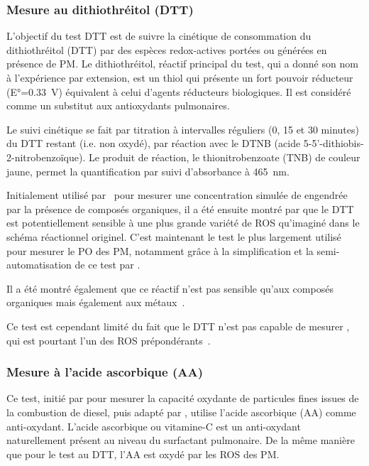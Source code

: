 \subsubsection{Mesure au dithiothréitol (DTT)}%
\label{ssub:mesure_au_dtt}

L’objectif du test DTT est de suivre la cinétique de consommation du dithiothréitol (DTT)
par des espèces redox-actives portées ou générées en présence de PM. Le dithiothréitol,
réactif principal du test, qui a donné son nom à l’expérience par extension, est un thiol
qui présente un fort pouvoir réducteur (E°=\SI{0.33}{\V}) équivalent à celui d’agents réducteurs
biologiques. Il est considéré comme un substitut aux antioxydants pulmonaires.

Le suivi cinétique se fait par titration à intervalles réguliers (0, 15 et 30 minutes) du DTT
restant (i.e. non oxydé), par réaction avec le DTNB (acide
5-5'-dithiobis-2-nitrobenzoïque). Le produit de réaction, le thionitrobenzoate (TNB) de
couleur jaune, permet la quantification par suivi d'absorbance à \SI{465}{nm}.

Initialement utilisé par~\textcite{choRedox2005} pour mesurer une concentration simulée de
 engendrée par la présence de composés organiques, il a été ensuite montré par
\textcite{beiReaction2014} que le DTT est potentiellement sensible à une plus grande
variété de ROS qu'imaginé dans le schéma réactionnel originel. C'est maintenant le test le
plus largement utilisé pour mesurer le PO des PM, notamment grâce à la simplification et
la semi-automatisation de ce test par \textcite{fangSemiautomated2015}.

Il a été montré également que ce réactif n'est pas sensible qu'aux composés organiques
mais également aux métaux~\autocite{charrierDithiothreitol2012,linGeneration2011}.

Ce test est cependant limité du fait que le DTT n'est pas capable de mesurer
, qui est pourtant l'un des ROS prépondérants~\autocite{xiongRethinking2017}.

\subsubsection{Mesure à l'acide ascorbique (AA)}%
\label{ssub:mesure_à_l_aa}

Ce test, initié par \textcite{zielinskiModeling1999} pour mesurer la capacité oxydante de
particules fines issues de la combustion de diesel, puis adapté par
\textcite{mudwayVitro2004,ayresEvaluating2008}, utilise l'acide ascorbique (AA) comme
anti-oxydant.
L'acide ascorbique ou vitamine-C est un anti-oxydant naturellement présent au niveau du
surfactant pulmonaire. De la même manière que pour le test au DTT, l'AA est oxydé par
les ROS des PM.

